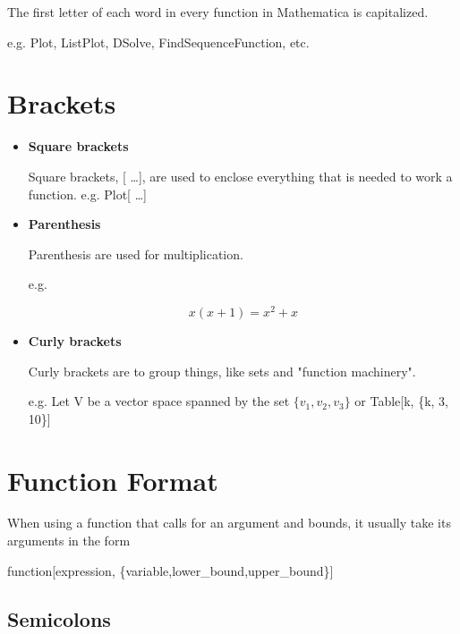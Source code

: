 \documentclass[11pt,a4paper,twoside]{article}
\begin{document}
			The first letter of each word in every function in Mathematica is capitalized.
				
			e.g. Plot, ListPlot, DSolve, FindSequenceFunction, etc.
			
		\section{Brackets}
			
			\begin{itemize}
				
				\item %
					
					\textbf{Square brackets}
					
					Square brackets, [ \dots ], are used to enclose everything that is needed to work a function.  e.g. Plot[ \dots ]
					
				\item %
					
					\textbf{Parenthesis}
					
					Parenthesis are used for multiplication. 
						
					e.g. 
					
					\[ x( x + 1 ) = x^2 + x \]
					
				\item %
					
					\textbf{Curly brackets}
					
					Curly brackets are to group things, like sets and "function machinery".
						
					e.g. Let V be a vector space spanned by the set $ \{ v_1 , v_2, v_3 \} $ or Table[k, \{k, 3, 10\}]

			\end{itemize}
			
		\section{Function Format}
			
			When using a function that calls for an argument and bounds, it usually take its arguments in the form
				
			\begin{center} function[expression, \{variable,lower\_bound,upper\_bound\}] \end{center}
			
			\subsection{Semicolons}
			
\end{document}
